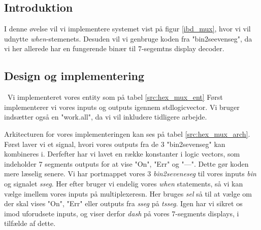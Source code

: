 \documentclass[../journal2.tex]{subfiles}
\begin{document}
\subsection{Introduktion}

I denne øvelse vil vi implementere systemet vist på figur \ref{ibd_mux}, hvor vi vil udnytte \textit{when}-stemenets. Desuden vil vi genbruge koden fra "bin2seevenseg", da vi her allerede har en fungerende binær til 7-segemtns display decoder.


\subsection{Design og implementering}
\
Vi implementeret vores entity som på tabel \ref{src:hex_mux_ent} Først implementerer vi vores inputs og outputs igennem std\textunderscore logic\textunderscore vector. Vi bruger indsætter også en "work.all", da vi vil inkludere tidligere arbejde.

\begin{table}[H]
    \centering
      \framebox{
        \rule{8pt}{0pt}
          
  }
  \caption{Entity af hex\textunderscore mux}
  \label{src:hex_mux_ent}
\end{table}

Arkitecturen for vores implementeringen kan ses på tabel \ref{src:hex_mux_arch}. Først laver vi et signal, hvori vores outputs fra de 3 "bin2sevenseg" kan kombineres i. Derfefter har vi lavet en række konstanter i logic vectors, som indeholder 7 segments outputs for at vise "On", "Err" og "---". Dette gør koden mere læselig senere. Vi har portmappet vores 3 \textit{bin2seveneseg} til vores inputs \textit{bin} og signalet \textit{sseg}. Her efter bruger vi endelig vores \textit{when} statements, så vi kan vælge imellem vores inputs på multiplexeresn. Her bruges \textit{sel} så til at vælge om der skal vises "On", "Err" eller outputs fra \textit{sseg} på \textit{tsseg}. Igen har vi sikret os imod uforudsete inputs, og viser derfor \textit{dash} på vores 7-segments displays, i tilfælde af dette.

\begin{table}[H]
    \centering
      \framebox{
        \rule{8pt}{0pt}
          
  }
  \caption{Architecture af hex\textunderscore mux}
  \label{src:hex_mux_arch}
\end{table}
\end{document}
